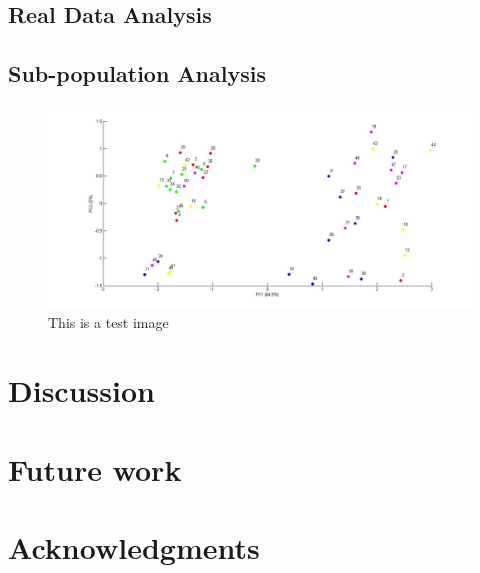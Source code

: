 \documentclass[twocolumn,oneside,conference]
{IEEEtran}
\begin{document}
\subsection{Real Data Analysis}
\subsection{Sub-population Analysis}
\begin{figure}[h]
	\includegraphics[width=\linewidth]{final.jpg}
	\caption{This is a test image}
	\label{fig1: this is test image}
\end{figure}

\section{Discussion}

\section{Future work}

\section*{Acknowledgments}


\printbibliography
\end{document}
